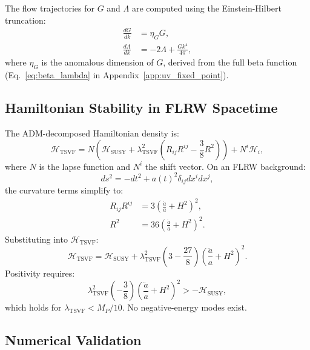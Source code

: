 \documentclass[twocolumn,superscriptaddress,floatfix]{revtex4-2}
\begin{document}
The flow trajectories for $G$ and $\Lambda$ are computed using the Einstein-Hilbert truncation:
\begin{align}
\frac{dG}{dk} &= \eta_G G, 
\label{eq:beta_G} \\
\frac{d\Lambda}{dk} &= -2\Lambda + \frac{G k^4}{4\pi},
\label{eq:beta_Lambda}
\end{align}
where $\eta_G$ is the anomalous dimension of $G$, derived from the full beta function (Eq.~\ref{eq:beta_lambda} in Appendix~\ref{app:uv_fixed_point}).


\subsection{Hamiltonian Stability in FLRW Spacetime}
\label{app:hamiltonian}

The ADM-decomposed Hamiltonian density is:
\begin{equation}
\mathcal{H}_{\text{TSVF}} = N\left(\mathcal{H}_{\text{SUSY}} + \lambda_{\text{TSVF}}^2\left(R_{ij}R^{ij} - \frac{3}{8}R^2\right)\right) + N^i\mathcal{H}_i,
\end{equation}
where \(N\) is the lapse function and \(N^i\) the shift vector. On an FLRW background:
\begin{equation}
ds^2 = -dt^2 + a(t)^2\delta_{ij}dx^i dx^j,
\end{equation}
the curvature terms simplify to:
\begin{align}
R_{ij}R^{ij} &= 3\left(\frac{\ddot{a}}{a} + H^2\right)^2, \\
R^2 &= 36\left(\frac{\ddot{a}}{a} + H^2\right)^2.
\end{align}
Substituting into \(\mathcal{H}_{\text{TSVF}}\):
\begin{equation}
\mathcal{H}_{\text{TSVF}} = \mathcal{H}_{\text{SUSY}} + \lambda_{\text{TSVF}}^2\left(3 - \frac{27}{8}\right)\left(\frac{\ddot{a}}{a} + H^2\right)^2.
\end{equation}
Positivity requires:
\begin{equation}
\lambda_{\text{TSVF}}^2\left(-\frac{3}{8}\right)\left(\frac{\ddot{a}}{a} + H^2\right)^2 > -\mathcal{H}_{\text{SUSY}},
\end{equation}
which holds for \(\lambda_{\text{TSVF}} < M_P/10\). No negative-energy modes exist.


\subsection{Numerical Validation}
\label{app:numerics}
\end{document}
